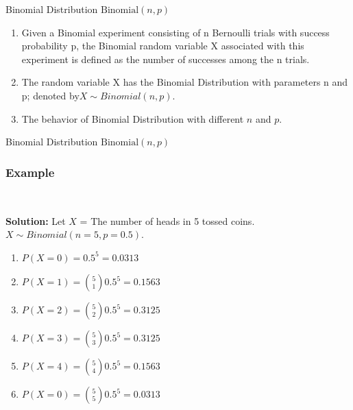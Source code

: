 \documentclass[compress]{beamer}
\begin{document}
\begin{frame}{Binomial Distribution $\text{Binomial}(n,p)$}
\begin{enumerate}
\item Given a Binomial experiment consisting of n Bernoulli trials with
success probability p, the Binomial random variable X associated
with this experiment is defined as the number of successes among the
n trials.
\item The random variable X has the Binomial Distribution with
parameters n and p; denoted by$ X\sim Binomial(n, p).$

\item The behavior of Binomial Distribution with different $n$ and $p$.

\end{enumerate}

\end{frame}




\begin{frame}{Binomial Distribution $\text{Binomial}(n,p)$}
\end{frame}




\begin{frame}\frametitle{Example}
\vspace{-.1in}
\\
\pause
\vspace{.1in}
{\tiny 
{\bf Solution: }
Let $X$ = The number of heads in 5 tossed coins. $X\sim Binomial(n=5, p=0.5)$.
\begin{enumerate}
\item $P(X = 0) =0.5^5 = 0.0313$
\item $P(X = 1) ={5 \choose 1}0.5^5 =0.1563$
\item $P(X = 2) ={5 \choose 2}0.5^5 =0.3125$
\item $P(X = 3) ={5 \choose 3}0.5^5 =0.3125$
\item $P(X = 4) ={5 \choose 4}0.5^5 =0.1563$
\item $P(X = 0) ={5 \choose 5}0.5^5 = 0.0313$
\end{enumerate}
}
\end{frame}
\end{document}
